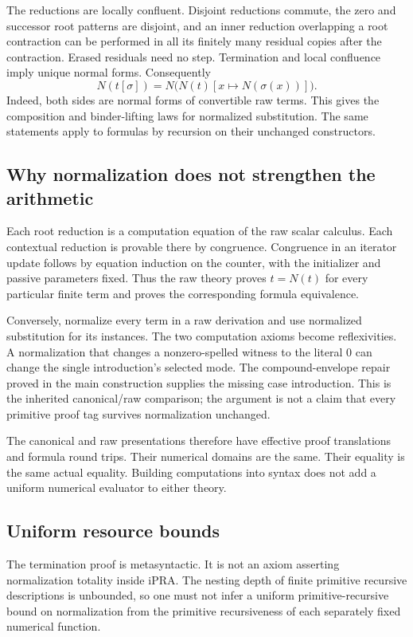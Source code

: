 The reductions are locally confluent.  Disjoint reductions commute, the
zero and successor root patterns are disjoint, and an inner reduction
overlapping a root contraction can be performed in all its finitely many
residual copies after the contraction.  Erased residuals need no step.
Termination and local confluence imply unique normal forms.  Consequently
\[
 N(t[\sigma])=
 N\bigl(N(t)[x\mapsto N(\sigma(x))]\bigr).
 \tag{Coherence}\label{eq:coherence}
\]
Indeed, both sides are normal forms of convertible raw terms.  This gives
the composition and binder-lifting laws for normalized substitution.
The same statements apply to formulas by recursion on their unchanged
constructors.

\subsection{Why normalization does not strengthen the arithmetic}

Each root reduction is a computation equation of the raw scalar calculus.
Each contextual reduction is provable there by congruence.  Congruence in
an iterator update follows by equation induction on the counter, with the
initializer and passive parameters fixed.  Thus the raw theory proves
$t=N(t)$ for every particular finite term and proves the corresponding
formula equivalence.

Conversely, normalize every term in a raw derivation and use normalized
substitution for its instances.  The two computation axioms become
reflexivities.  A normalization that changes a nonzero-spelled witness to
the literal $0$ can change the single introduction's selected mode.  The
compound-envelope repair proved in the main construction supplies the
missing case introduction.  This is the inherited canonical/raw
comparison; the argument is not a claim that every primitive proof tag
survives normalization unchanged.

The canonical and raw presentations therefore have effective proof
translations and formula round trips.  Their numerical domains are the
same.  Their equality is the same actual equality.  Building computations
into syntax does not add a uniform numerical evaluator to either theory.

\subsection{Uniform resource bounds}

The termination proof is metasyntactic.  It is not an axiom asserting
normalization totality inside iPRA.  The nesting depth of finite primitive
recursive descriptions is unbounded, so one must not infer a uniform
primitive-recursive bound on normalization from the primitive recursiveness
of each separately fixed numerical function.

